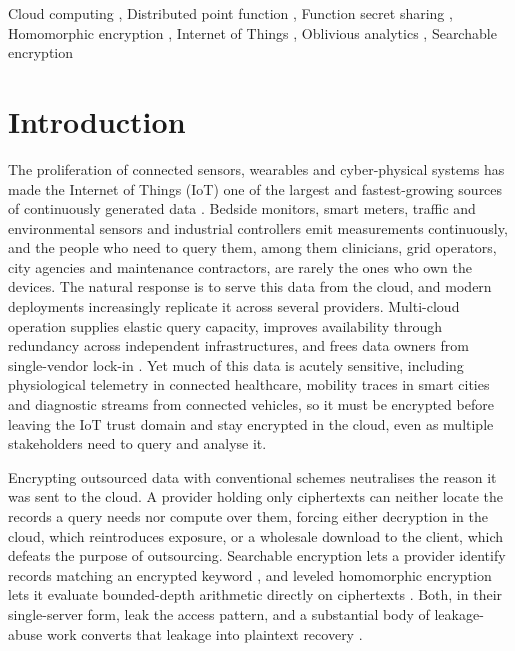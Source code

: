 \documentclass[a4paper,fleqn]{cas-dc}
\begin{document}
\begin{keywords}
Cloud computing \sep
Distributed point function \sep
Function secret sharing \sep
Homomorphic encryption \sep
Internet of Things \sep
Oblivious analytics \sep
Searchable encryption
\end{keywords}

\maketitle

\section{Introduction}
\label{sec:intro}

The proliferation of connected sensors, wearables and cyber-physical systems
has made the Internet of Things (IoT) one of the largest and fastest-growing
sources of continuously generated data \citep{atzori2010internet}. Bedside
monitors, smart meters, traffic and environmental sensors and industrial
controllers emit measurements continuously, and the people who need to query
them, among them clinicians, grid operators, city agencies and maintenance
contractors, are rarely the ones who own the devices. The natural response is
to serve this data from the cloud, and modern deployments increasingly
replicate it across several providers. Multi-cloud operation supplies elastic
query capacity, improves availability through redundancy across independent
infrastructures, and frees data owners from single-vendor lock-in
\citep{petcu2013multicloud,grozev2014intercloud}. Yet much of this data is
acutely sensitive, including physiological telemetry in connected healthcare,
mobility traces in smart cities and diagnostic streams from connected
vehicles, so it must be encrypted before leaving the IoT trust domain and stay
encrypted in the cloud, even as multiple stakeholders need to query and
analyse it.

Encrypting outsourced data with conventional schemes neutralises the reason it
was sent to the cloud. A provider holding only ciphertexts can neither locate
the records a query needs nor compute over them, forcing either decryption in
the cloud, which reintroduces exposure, or a wholesale download to the client,
which defeats the purpose of outsourcing. Searchable encryption lets a
provider identify records matching an encrypted keyword
\citep{song2000practical,curtmola2006searchable,islam2023keyword}, and leveled
homomorphic encryption lets it evaluate bounded-depth arithmetic directly on
ciphertexts \citep{fan2012somewhat,cryptoeprint:2016/421}. Both, in their
single-server form, leak the access pattern, and a substantial body of
leakage-abuse work converts that leakage into plaintext recovery
\citep{islam2012access,cash2015leakage,grubbs2017leakage}.
\end{document}
